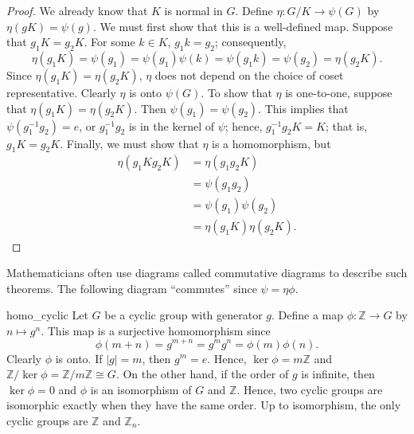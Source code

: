  
\begin{proof}
We already know that $K$ is normal in $G$. Define $\eta: G/K
\rightarrow \psi(G)$ by $\eta(gK) = \psi(g)$.  We must first show that
this is a well-defined map. Suppose that $g_1 K =g_2 K$. For some $k \in
K$, $g_1 k=g_2$; consequently, 
\[
\eta(g_1 K) = \psi(g_1) = \psi(g_1) \psi(k) = \psi(g_1k) = \psi(g_2)
= \eta(g_2 K). 
\]
Since $\eta(g_1 K) = \eta(g_2 K)$, $\eta$ does not depend on the 
choice of coset representative. Clearly $\eta$ is onto $\psi( G)$. 
To show that $\eta$ is one-to-one, suppose that $\eta(g_1 K) = 
\eta(g_2 K)$. Then $\psi(g_1) = \psi(g_2)$. This implies that 
$\psi( g_1^{-1} g_2 ) = e$, or $g_1^{-1} g_2$ is in the kernel of $\psi$; 
hence, $g_1^{-1} g_2K = K$; that is, $g_1K =g_2K$.  Finally, we must 
show that $\eta$ is a homomorphism, but 
\begin{align*}
\eta( g_1K g_2K ) & = \eta(g_1 g_2K) \\
& = \psi(g_1 g_2) \\
& = \psi(g_1) \psi(g_2) \\
& = \eta( g_1K) \eta( g_2K ).
\end{align*}
\end{proof}
 
 
\medskip
 
 
Mathematicians often use diagrams called {\bfi commutative
diagrams\/} to describe such theorems. The
following diagram ``commutes'' since $\psi = \eta \phi$. 



\begin{center}

\end{center}

 
 
\begin{example}{homo_cyclic}
Let $G$ be a cyclic group with generator $g$. Define a map $\phi :
{\mathbb Z} \rightarrow G$ by $n \mapsto g^n$.  This map is a surjective
homomorphism since  
\[
\phi( m + n) = g^{m+n} = g^m g^n = \phi(m) \phi(n).
\]
Clearly $\phi$ is onto. If $|g| = m$, then  $g^m = e$. Hence, $\ker
\phi = m {\mathbb Z}$ and ${\mathbb Z} / \ker \phi =  {\mathbb Z} / m {\mathbb Z}
\cong G$. On the other hand, if the order of $g$ is infinite, then
$\ker \phi = 0$ and $\phi$ is an isomorphism of $G$ and ${\mathbb Z}$.
Hence, two cyclic groups are isomorphic exactly when they have the
same order. Up to isomorphism, the only cyclic groups are ${\mathbb Z}$
and ${\mathbb Z}_n$. 
\end{example}
 
